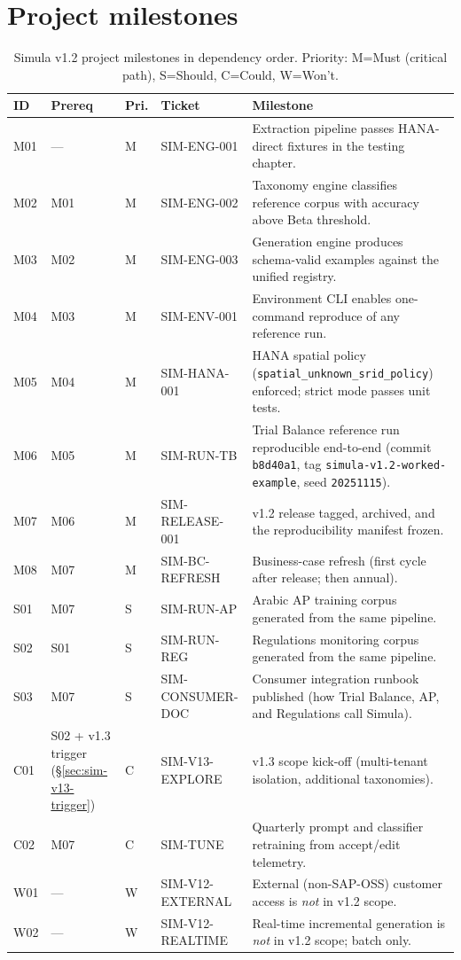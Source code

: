 \documentclass[12pt,a4paper,twoside]{report}
\begin{document}
\section{Project milestones}\label{sec:sim-milestones}

\begin{table}[htbp]
\centering
\caption{Simula v1.2 project milestones in dependency order.
Priority: M=Must (critical path), S=Should, C=Could, W=Won't.}
\label{tab:sim-milestones}
\footnotesize
\begin{tabularx}{\linewidth}{@{}l l l l X@{}}
\toprule
\textbf{ID} & \textbf{Prereq} & \textbf{Pri.} & \textbf{Ticket} & \textbf{Milestone} \\ \midrule
M01 & ---      & M & SIM-ENG-001       & Extraction pipeline passes HANA-direct fixtures in the testing chapter. \\
M02 & M01      & M & SIM-ENG-002       & Taxonomy engine classifies reference corpus with accuracy above Beta threshold. \\
M03 & M02      & M & SIM-ENG-003       & Generation engine produces schema-valid examples against the unified registry. \\
M04 & M03      & M & SIM-ENV-001       & Environment CLI enables one-command reproduce of any reference run. \\
M05 & M04      & M & SIM-HANA-001      & HANA spatial policy (\texttt{spatial\_unknown\_srid\_policy}) enforced; strict mode passes unit tests. \\
M06 & M05      & M & SIM-RUN-TB        & Trial Balance reference run reproducible end-to-end (commit \texttt{b8d40a1}, tag \texttt{simula-v1.2-worked-example}, seed \texttt{20251115}). \\
M07 & M06      & M & SIM-RELEASE-001   & v1.2 release tagged, archived, and the reproducibility manifest frozen. \\
M08 & M07      & M & SIM-BC-REFRESH    & Business-case refresh (first cycle after release; then annual). \\
S01 & M07      & S & SIM-RUN-AP        & Arabic AP training corpus generated from the same pipeline. \\
S02 & S01      & S & SIM-RUN-REG       & Regulations monitoring corpus generated from the same pipeline. \\
S03 & M07      & S & SIM-CONSUMER-DOC  & Consumer integration runbook published (how Trial Balance, AP, and Regulations call Simula). \\
C01 & S02 + v1.3 trigger (\S\ref{sec:sim-v13-trigger}) & C & SIM-V13-EXPLORE & v1.3 scope kick-off (multi-tenant isolation, additional taxonomies). \\
C02 & M07      & C & SIM-TUNE          & Quarterly prompt and classifier retraining from accept/edit telemetry. \\
W01 & ---      & W & SIM-V12-EXTERNAL  & External (non-SAP-OSS) customer access is \emph{not} in v1.2 scope. \\
W02 & ---      & W & SIM-V12-REALTIME  & Real-time incremental generation is \emph{not} in v1.2 scope; batch only. \\
\bottomrule
\end{tabularx}
\end{table}
\end{document}
